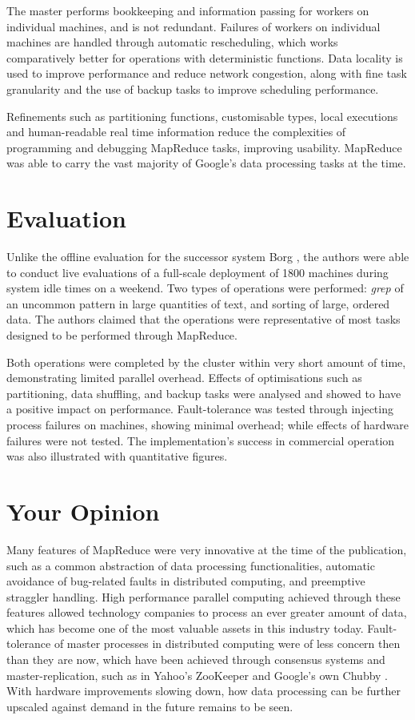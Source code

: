 \documentclass[11pt]{article}
\begin{document}
The master performs bookkeeping and information passing for workers on individual machines, and is not redundant. Failures of workers on individual machines are handled through automatic rescheduling, which works comparatively better for operations with deterministic functions. Data locality is used to improve performance and reduce network congestion, along with fine task granularity and the use of backup tasks to improve scheduling performance. 

Refinements such as partitioning functions, customisable types, local executions and human-readable real time information reduce the complexities of programming and debugging MapReduce tasks, improving usability. MapReduce was able to carry the vast majority of Google's data processing tasks at the time.

\section*{Evaluation}

Unlike the offline evaluation for the successor system Borg \cite{verma2015large}, the authors were able to conduct live evaluations of a full-scale deployment of 1800 machines during system idle times on a weekend. Two types of operations were performed: \emph{grep} of an uncommon pattern in large quantities of text, and sorting of large, ordered data. The authors claimed that the operations were representative of most tasks designed to be performed through MapReduce. 

Both operations were completed by the cluster within very short amount of time, demonstrating limited parallel overhead. Effects of optimisations such as partitioning, data shuffling, and backup tasks were analysed and showed to have a positive impact on performance. Fault-tolerance was tested through injecting process failures on machines, showing minimal overhead; while effects of hardware failures were not tested. The implementation's success in commercial operation was also illustrated with quantitative figures.

\section*{Your Opinion}

Many features of MapReduce were very innovative at the time of the publication, such as a common abstraction of data processing functionalities, automatic avoidance of bug-related faults in distributed computing, and preemptive straggler handling. High performance parallel computing achieved through these features allowed technology companies to process an ever greater amount of data, which has become one of the most valuable assets in this industry today. Fault-tolerance of master processes in distributed computing were of less concern then than they are now, which have been achieved through consensus systems and master-replication, such as in Yahoo's ZooKeeper \cite{hunt2010zookeeper} and Google's own Chubby \cite{burrows2006chubby}. With hardware improvements slowing down, how data processing can be further upscaled against demand in the future remains to be seen.
\end{document}
